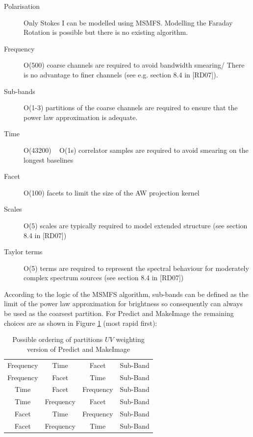 \documentclass[11pt,a4paper,variablewidth]{article}
\begin{document}
\begin{description}
\item[Polarisation] Only Stokes I can be modelled using MSMFS. Modelling the Faraday Rotation is possible but there is no existing algorithm.
\item[Frequency] O(500) coarse channels are required to avoid bandwidth smearing/ There is no advantage to finer channels (see e.g. section 8.4 in [RD07]).
\item[Sub-bands] O(1-3) partitions of the coarse channels are required to ensure that the power law approximation is adequate.
\item[Time] O(43200) ~ O(1s) correlator samples are required to avoid smearing on the longest baselines
\item[Facet] O(100) facets to limit the size of the AW projection kernel
\item[Scales] O(5) scales are typically required to model extended structure (see section 8.4 in [RD07])
\item[Taylor terms] O(5) terms are required to represent the spectral behaviour for moderately complex spectrum sources (see section 8.4 in [RD07])
\end{description}

According to the logic of the MSMFS algorithm, sub-bands can be defined as the limit of the power law approximation for brightness so consequently can always be used as the coarsest partition. For Predict and MakeImage the remaining choices are as shown in Figure \ref{tab:partitions} (most rapid first):

\begin{table}[htp]
 \caption{Possible ordering of partitions $UV$ weighting version of Predict and MakeImage}
 \label{tab:partitions}
 \begin{center}
 \begin{tabular}{|c|c|c|c|}
\hline
Frequency & Time & Facet & Sub-Band \\
Frequency & Facet & Time & Sub-Band \\
Time & Facet & Frequency & Sub-Band \\
Time & Frequency & Facet & Sub-Band \\
Facet & Time & Frequency & Sub-Band \\
Facet & Frequency & Time & Sub-Band \\
\hline
\end{tabular}
\end{center}
\end{table}
\end{document}
